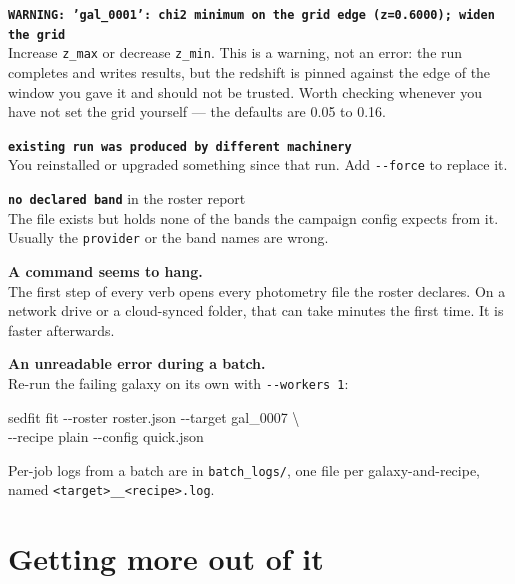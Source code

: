 \documentclass[11pt]{article}
\begin{document}
\vspace{6pt}
\noindent\textbf{\texttt{WARNING: 'gal\_0001': chi2 minimum on the grid
edge (z=0.6000); widen the grid}}\\
Increase \texttt{z\_max} or decrease \texttt{z\_min}. This is a warning,
not an error: the run completes and writes results, but the redshift is
pinned against the edge of the window you gave it and should not be
trusted. Worth checking whenever you have not set the grid yourself ---
the defaults are 0.05 to 0.16.

\vspace{6pt}
\noindent\textbf{\texttt{existing run was produced by different machinery}}\\
You reinstalled or upgraded something since that run. Add
\texttt{-{}-force} to replace it.

\vspace{6pt}
\noindent\textbf{\texttt{no declared band}} in the roster report\\
The file exists but holds none of the bands the campaign config expects
from it. Usually the \texttt{provider} or the band names are wrong.

\vspace{6pt}
\noindent\textbf{A command seems to hang.}\\
The first step of every verb opens every photometry file the roster
declares. On a network drive or a cloud-synced folder, that can take
minutes the first time. It is faster afterwards.

\vspace{6pt}
\noindent\textbf{An unreadable error during a batch.}\\
Re-run the failing galaxy on its own with \texttt{-{}-workers 1}:

\begin{cmd}\ttfamily
sedfit fit -{}-roster roster.json -{}-target gal\_0007 \textbackslash\\
\hspace*{4em}-{}-recipe plain -{}-config quick.json
\end{cmd}

Per-job logs from a batch are in \texttt{batch\_logs/}, one file per
galaxy-and-recipe, named \texttt{<target>\_\_<recipe>.log}.

\section{Getting more out of it}
\end{document}
